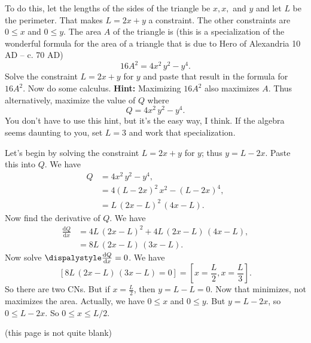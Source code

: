 \documentclass[12pt,fleqn,answers]{exam}
\begin{document}
\begin{questions}
    \quad To do this, let the lengths of the sides of the triangle be $x,x,$
    and $y$ and let $L$ be the perimeter. That makes $L = 2 x + y$ a
    constraint. The other constraints are $0 \leq x$ and $0 \leq y$.
    The area $A$ of the triangle is (this is a specialization of 
    the wonderful formula for the area of a triangle that is due to Hero of Alexandria 
    10 AD – c. 70 AD)
    \begin{equation*}
        16 {{A}^{2}}=4 {{x}^{2}}\, {{y}^{2}}-{{y}^{4}}.
    \end{equation*}
    Solve the constraint $L = 2 x + y$ for $y$ and paste that
    result in  the formula for $16 A^2$. Now do some calculus.
    \textbf{Hint:} Maximizing $16 A^2$ also maximizes $A$.  Thus
    alternatively, maximize the value of $Q$ where
    \begin{equation*}
        Q =4 {{x}^{2}}\, {{y}^{2}}-{{y}^{4}}.
    \end{equation*}
    You
    don't have to use this hint, but it's the easy way, I think.
    \quad If the algebra seems daunting to you, set $L = 3$ and work
    that specialization. 


   \begin{solution}
   Let's begin by solving the constraint  $L = 2 x + y$ for $y$; thus  $y = L - 2 x$.  Paste this into $Q$. We have
   \begin{align*}
      Q  &=4 {{x}^{2}}\, {{y}^{2}}-{{y}^{4}},\\
          &= 4 {{\left( L-2 x\right) }^{2}}\, {{x}^{2}}-{{\left( L-2 x\right) }^{4}}, \\
          &= L\, {{\left( 2 x-L\right) }^{2}}\, \left( 4 x-L\right).       
   \end{align*}
   Now find the derivative of $Q$. We have
    \begin{align*}
      \frac{\mathrm{d} Q}{\mathrm{d} x}   &= 4 L\, {{\left( 2 x-L\right) }^{2}}+4 L\, \left( 2 x-L\right) \, \left( 4 x-L\right) ,\\
                                                              &= 8 L\, \left( 2 x-L\right) \, \left( 3 x-L\right).
   \end{align*}   
   Now solve $\dispalystyle \frac{\mathrm{d} Q}{\mathrm{d} x} = 0$. We have
   \begin{equation}
   \left[ 8 L\, \left( 2 x-L\right) \, \left( 3 x-L\right) = 0 \right] = \left[ x = \frac{L}{2}, x = \frac{L}{3} \right].
   \end{equation}
   So there are two CNs.  But if $x=  \frac{L}{2}$, then $y = L - L = 0$. Now that minimizes, not maximizes the area.  Actually, we have
   $0 \leq x$ and $0 \leq y$. But $y = L - 2 x$, so  $0 \leq L - 2 x$. So $0 \leq x \leq L/2$. 
   \end{solution}

   (this page is not quite blank)

\end{questions}
\end{document}
